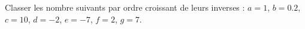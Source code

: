 
\begin{exercice}\label{exosmath-0259}

Classer les nombre suivants par ordre croissant de leurs inverses : \( a=1\), \( b=0.2\), \( c=10\), \( d=-2\), \( e=-7\), \( f=2\), \( g=7\).

\end{exercice}
